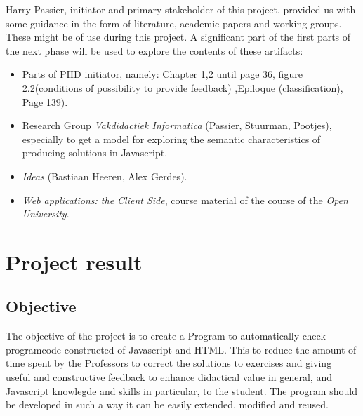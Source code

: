 \documentclass{article}
\begin{document}
Harry Passier, initiator and primary stakeholder of this project, provided us with some guidance in the form of literature, academic papers and working groups. These might be of use during this project. A significant part of the first parts of the next phase will be used to explore the contents of these artifacts:
\begin{itemize}
  \item Parts of PHD initiator, namely: Chapter 1,2 until page 36, figure 2.2(conditions of possibility to provide feedback) ,Epiloque (classification), Page 139).
  \item Research Group {\em Vakdidactiek Informatica} (Passier, Stuurman, Pootjes), especially to get a model for exploring the semantic characteristics of producing solutions in Javascript.
  \item {\em Ideas} (Bastiaan Heeren, Alex Gerdes).
  \item {\em Web applications: the Client Side}, course material of the course of the {\em Open University}.
\end{itemize}

\section{Project result}

\subsection{Objective}

The objective of the project is to create a Program to automatically check programcode constructed of Javascript and HTML. This to reduce the amount of time spent by the Professors to correct the solutions to exercises and giving useful and constructive feedback to enhance didactical value in general, and Javascript knowlegde and skills in particular, to the student. The program should be developed in such a way it can be easily extended, modified and reused. 
\end{document}
